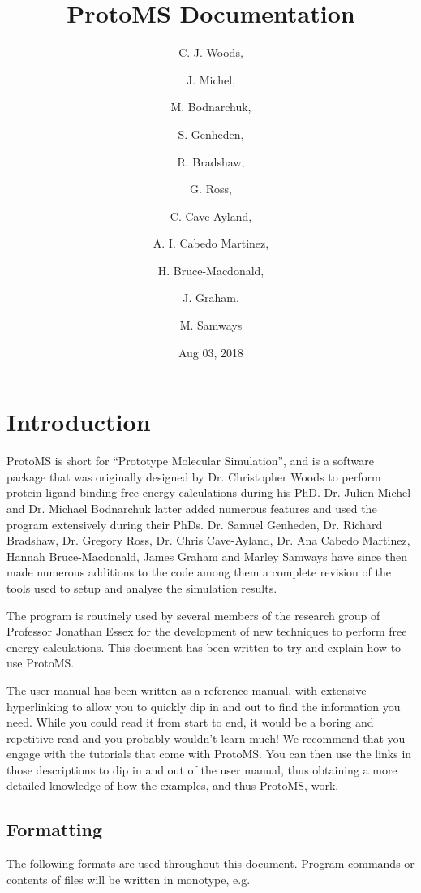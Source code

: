\documentclass[letterpaper,10pt,english]{sphinxmanual}
\title{ProtoMS Documentation}
\date{Aug 03, 2018}
\author{C. J. Woods, \and J. Michel, \and M. Bodnarchuk, \and S. Genheden, \and R. Bradshaw, \and G. Ross, \and C. Cave-Ayland, \and A. I. Cabedo Martinez, \and H. Bruce-Macdonald, \and J. Graham, \and M. Samways}
\begin{document}
\maketitle
\sphinxtableofcontents
{}\label{\detokenize{index::doc}}



\chapter{Introduction}
\label{\detokenize{introduction:introduction}}\label{\detokenize{introduction::doc}}
ProtoMS is short for “Prototype Molecular Simulation”, and is a software package that was originally designed by Dr. Christopher Woods to perform protein-ligand binding free energy calculations during his PhD. Dr. Julien Michel and Dr. Michael Bodnarchuk latter added numerous features and used the program extensively during their PhDs. Dr. Samuel Genheden, Dr. Richard Bradshaw, Dr. Gregory Ross, Dr. Chris Cave-Ayland, Dr. Ana Cabedo Martinez, Hannah Bruce-Macdonald, James Graham and Marley Samways have since then made numerous additions to the code among them a complete revision of the tools used to setup and analyse the simulation results.

The program is routinely used by several members of the research group of Professor Jonathan Essex for the development of new techniques to perform free energy calculations. This document has been written to try and explain how to use ProtoMS.

The user manual has been written as a reference manual, with extensive hyperlinking to allow you to quickly dip in and out to find the information you need. While you could read it from start to end, it would be a boring and repetitive read and you probably wouldn’t learn much! We recommend that you engage with the tutorials that come with ProtoMS. You can then use the links in those descriptions to dip in and out of the user manual, thus obtaining a more detailed knowledge of how the examples, and thus ProtoMS, work.


\section{Formatting}
\label{\detokenize{introduction:formatting}}
The following formats are used throughout this document. Program commands or contents of files will be written in monotype, e.g.

%
\begin{sphinxVerbatim}[commandchars=\\\{\}]
 
\end{sphinxVerbatim}
\end{document}

